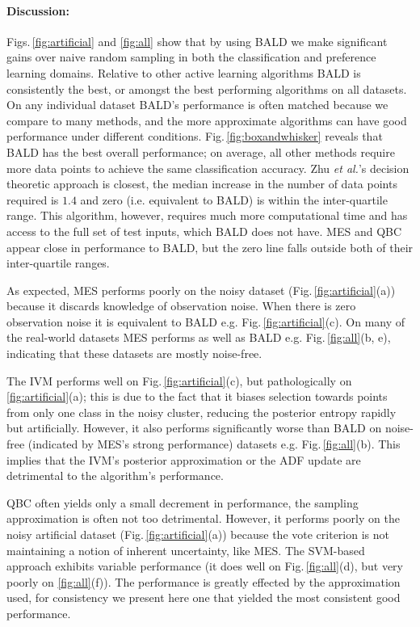\documentclass[twoside]{article}
\newcommand{\ourmethod}{BALD } %
\begin{document}
\paragraph{Discussion:} Figs.\,\ref{fig:artificial} and \ref{fig:all} show that by using \ourmethod we make significant gains over naive random sampling in both the classification and preference learning domains. Relative to other active learning algorithms \ourmethod is consistently the best, or amongst the best performing algorithms on all datasets. On any individual dataset BALD's performance is often matched because we compare to many methods, and the more approximate algorithms can have good performance under different conditions. Fig.\,\ref{fig:boxandwhisker} reveals that BALD has the best overall performance; on average, all other methods require more data points to achieve the same classification accuracy. Zhu \emph{et al.}'s decision theoretic approach is closest, the median increase in the number of data points required is $1.4$ and zero (i.e. equivalent to BALD) is within the inter-quartile range. This algorithm, however, requires much more computational time and has access to the full set of test inputs, which BALD does not have. MES and QBC appear close in performance to BALD, but the zero line falls outside both of their inter-quartile ranges.

As expected, MES performs poorly on the noisy dataset (Fig.\,\ref{fig:artificial}(a)) because it discards knowledge of observation noise. When there is zero observation noise it is equivalent to BALD e.g. Fig.\,\ref{fig:artificial}(c). On many of the real-world datasets MES performs as well as BALD e.g. Fig.\,\ref{fig:all}(b, e), indicating that these datasets are mostly noise-free.

The IVM performs well on Fig.\,\ref{fig:artificial}(c), but pathologically on \ref{fig:artificial}(a); this is due to the fact that it biases selection towards points from only one class in the noisy cluster, reducing the posterior entropy rapidly but artificially. However, it also performs significantly worse than BALD on noise-free (indicated by MES's strong performance) datasets e.g. Fig.\,\ref{fig:all}(b). This implies that the IVM's posterior approximation or the ADF update are detrimental to the algorithm's performance.

QBC often yields only a small decrement in performance, the sampling approximation is often not too detrimental. However, it performs poorly on the noisy artificial dataset (Fig.\,\ref{fig:artificial}(a)) because the vote criterion is not maintaining a notion of inherent uncertainty, like MES. The SVM-based approach exhibits variable performance (it does well on Fig.\,\ref{fig:all}(d), but very poorly on \ref{fig:all}(f)). The performance is greatly effected by the approximation used, for consistency we present here one that yielded the most consistent good performance.
\end{document}
